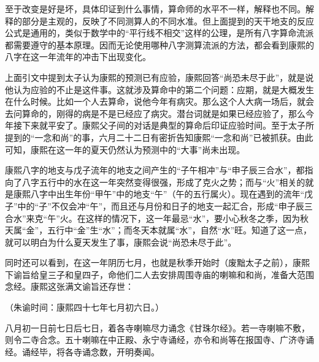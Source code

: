 
至于改变是好是坏，具体印证到什么事情，算命师的水平不一样，解释也不同。解释的部分是主观的，反映了不同测算人的不同水准。但上面提到的天干地支的反应公式是通用的，类似于数学中的“平行线不相交”这样的公理，是所有八字算命流派都需要遵守的基本原理。因而无论使用哪种八字测算流派的方法，都会看到康熙的八字在这一年流年的冲击下出现变化。



上面引文中提到太子认为康熙的预测已有应验，康熙回答“尚恐未尽于此”，就是说他认为应验的不止是这件事。这就涉及算命中的第二个问题：应期，就是大概发生在什么时候。比如一个人去算命，说他今年有病灾。那么这个人大病一场后，就会去问算命的，刚得的病是不是已经应了病灾。潜台词就是如果已经应验了，那么今年接下来就平安了。康熙父子间的对话是典型的算命后印证应验时间。至于太子所提到的“一念和尚”的事，六月二十二日有密折告知康熙“一念和尚”已被抓获。由此可知，康熙在这一年的夏天仍然认为预测中的“大事”尚未出现。



康熙八字的地支与戊子流年的地支之间产生的“子午相冲”与“申子辰三合水”，都指向了八字五行中的水在这一年突然变得很强，形成了克火之势；而与“火”相关的就是康熙八字中出生年份“甲午”中的地支“午”（午的五行属火）。现在遇到的流年“戊子”中的“子”不仅会冲“午”，而且还与月份和日子的地支一起汇合，形成“申子辰三合水”来克“午”火。在这样的情况下，这一年最忌“水”，要小心秋冬之季，因为秋天属“金”，五行中“金”生“水”；而冬天本就属“水”，自然“水”旺。知道了这一点，就可以明白为什么夏天发生了事，康熙会说“尚恐未尽于此”。



同时还可以看到，在这一年阴历七月，也就是秋季开始时（废黜太子之前），康熙下谕旨给皇三子和皇四子，命他们二人去安排周围寺庙的喇嘛和和尚，准备大范围念经。康熙这张满文谕旨还存世：



\begin{bookquote}（朱谕时间：康熙四十七年七月初六日。）\end{bookquote}


\begin{bookquote}八月初一日前七日后七日，着各寺喇嘛尽力诵念《甘珠尔经》。若一寺喇嘛不敷，则令二寺合念。五十喇嘛在中正殿、永宁寺诵经，亦令和尚等在报国寺、广济寺诵经。诵经毕，将各寺诵念数，开明奏闻。\end{bookquote}


